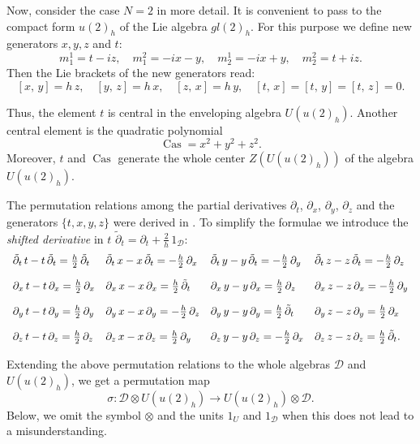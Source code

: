 \documentclass[11pt]{article}
\newcommand{\pa}{\partial}
\newcommand{\ot}{\otimes}
\DeclareMathOperator{\Cas}{Cas}
\newcommand{\DD}{\mathcal{D}}
\numberwithin{equation}{section}
\theoremstyle{plain}
\theoremstyle{definition}
\begin{document}
Now, consider the case $N=2$ in more detail. It is convenient to pass to the compact form $u(2)_h$ of the Lie algebra $gl(2)_h$.
For this purpose we define new generators $x,y,z$ and $t$:
\[
m_1^1=t-iz,\quad m_1^2=-ix-y,\quad m_2^1=-ix+y,\quad m_2^2=t+iz.
\]
Then the Lie brackets of the new generators read:
\[
[x, \, y]= h\, z,\quad [y, \, z]= h\, x,\quad[z, \, x]=h\, y,\quad [t, \, x]=[t, \, y]=[t, \, z]=0.
\]

Thus, the element $t$ is central in the enveloping algebra $U(u(2)_h)$. Another central element is the quadratic polynomial
\[
{{\Cas}} = x^2+y^2+z^2.
\]
Moreover, $t$ and $\Cas$ generate the whole center $Z(U(u(2)_h))$ of the algebra $U(u(2)_h)$.

The permutation relations among the partial derivatives $\partial_t$, $\partial_x$, $\partial_y$, $\partial_z$ and the
generators $\{t,x,y, z\}$ were derived in \cite{GPS2}. To simplify the formulae we introduce the {\em shifted derivative} in $t$
$\tilde \partial_t = \partial_t +\frac{2}{h}\,1_{\DD}$:
\begin{equation}
\begin{array}{l@{\quad}l@{\quad}l@{\quad}l}
	\tilde\pa_t\,t - t\,\tilde\pa_t = \frac{h}{2}\,\tilde\pa_t & \tilde\pa_t\, x - x\,\tilde\pa_t
	=-\frac{h}{2}\,\pa_x &
	\tilde\pa_t\, y - y\, \tilde\pa_t=-\frac{h}{2}\,\pa_y &\tilde\pa_t\, z - z\,\tilde\pa_t=- \frac{h}{2}\,\pa_z\\
	\rule{0pt}{7mm}
	\pa_x\, t - t\,\pa_x = \frac{h}{2}\,\pa_x &\pa_x \,x -  x\,\pa_x = \frac{h}{2}\,\tilde\pa_t &
	\pa_x \, y-  y\,\pa_x = \frac{h}{2}\,\pa_z & \pa_x \,z - z\, \pa_x  = - \frac{h}{2}\,\pa_y \\
	\rule{0pt}{7mm}
	\pa_y \,t - t \, \pa_y = \frac{h}{2}\,\pa_y & \pa_y \,x -  x\,  \pa_y = -\frac{h}{2}\,\pa_z &
	\pa_y \,y - y \,  \pa_y = \frac{h}{2}\,\tilde\pa_t & \pa_y \,z - z \,  \pa_ y= \frac{h}{2}\,\pa_x\\
	\rule{0pt}{7mm}
	\pa_z \,t - t \,\pa_z = \frac{h}{2}\,\pa_z & \pa_z \,x - x \,\pa_z = \frac{h}{2}\,\pa_y&
	\pa_z \,y -  y\,\pa_z = -\frac{h}{2}\,\pa_x & \pa_z \,z - z \,\pa_z = \frac{h}{2}\,\tilde\pa_t.
\end{array}
\label{perm}
\end{equation}

Extending the above permutation relations to the whole algebras $\DD$ and $U(u(2)_h)$, we get a permutation map
\[\sigma: {\DD}\ot U(u(2)_h)\to U(u(2)_h)\ot {\DD}   \label{map}.\]
Below,  we omit the symbol $\ot$ and the units $1_{U}$ and $1_{\DD}$  when this does not lead to a misunderstanding.
\end{document}
